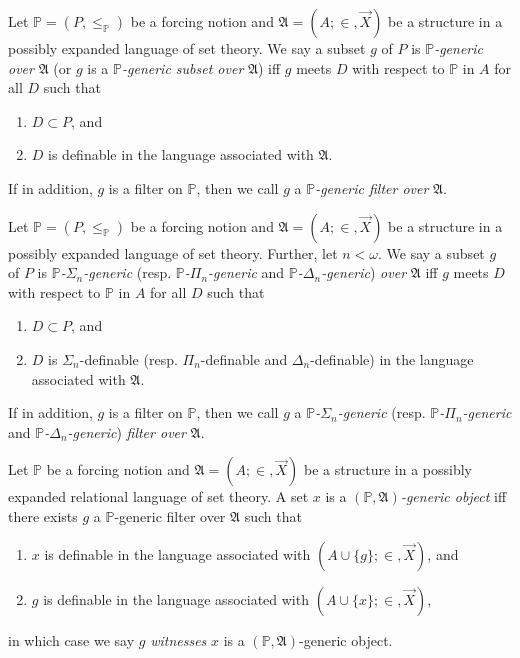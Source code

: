 \documentclass[12pt]{article}
\numberwithin{equation}{section}
\begin{document}
\begin{defi}
Let $\mathbb{P} = (P, \leq_{\mathbb{P}})$ be a forcing notion and $\mathfrak{A} = (A; \in, \Vec{X})$ be a structure in a possibly expanded language of set theory. We say a subset $g$ of $P$ is $\mathbb{P}$\emph{-generic over} $\mathfrak{A}$ (or $g$ is a $\mathbb{P}$\emph{-generic subset over} $\mathfrak{A}$) iff $g$ meets $D$ with respect to $\mathbb{P}$ in $A$ for all $D$ such that
\begin{enumerate}[label=(\alph*)]
    \item $D \subset P$, and
    \item $D$ is definable in the language associated with $\mathfrak{A}$.
\end{enumerate}
If in addition, $g$ is a filter on $\mathbb{P}$, then we call $g$ a $\mathbb{P}$\emph{-generic filter over} $\mathfrak{A}$.
\end{defi}

\begin{defi}
Let $\mathbb{P} = (P, \leq_{\mathbb{P}})$ be a forcing notion and $\mathfrak{A} = (A; \in, \Vec{X})$ be a structure in a possibly expanded language of set theory. Further, let $n < \omega$. We say a subset $g$ of $P$ is $\mathbb{P}$\emph{-}$\Sigma_n$\emph{-generic} (resp. $\mathbb{P}$\emph{-}$\Pi_n$\emph{-generic} and $\mathbb{P}$\emph{-}$\Delta_n$\emph{-generic}) \emph{over} $\mathfrak{A}$ iff $g$ meets $D$ with respect to $\mathbb{P}$ in $A$ for all $D$ such that
\begin{enumerate}[label=(\alph*)]
    \item $D \subset P$, and
    \item $D$ is $\Sigma_n$-definable (resp. $\Pi_n$-definable and $\Delta_n$-definable) in the language associated with $\mathfrak{A}$.
\end{enumerate}
If in addition, $g$ is a filter on $\mathbb{P}$, then we call $g$ a $\mathbb{P}$\emph{-}$\Sigma_n$\emph{-generic} (resp. $\mathbb{P}$\emph{-}$\Pi_n$\emph{-generic} and $\mathbb{P}$\emph{-}$\Delta_n$\emph{-generic}) \emph{filter over} $\mathfrak{A}$.
\end{defi}

\begin{defi}
Let $\mathbb{P}$ be a forcing notion and $\mathfrak{A} = (A; \in, \Vec{X})$ be a structure in a possibly expanded relational language of set theory. A set $x$ is a $(\mathbb{P}, \mathfrak{A})$\emph{-generic object} iff there exists $g$ a $\mathbb{P}$-generic filter over $\mathfrak{A}$ such that
\begin{enumerate}[label=(\alph*)]
    \item $x$ is definable in the language associated with $(A \cup \{g\}; \in, \Vec{X})$, and
    \item $g$ is definable in the language associated with $(A \cup \{x\}; \in, \Vec{X})$,
\end{enumerate}
in which case we say $g$ \emph{witnesses} $x$ is a $(\mathbb{P}, \mathfrak{A})$-generic object.
\end{defi}
\end{document}
